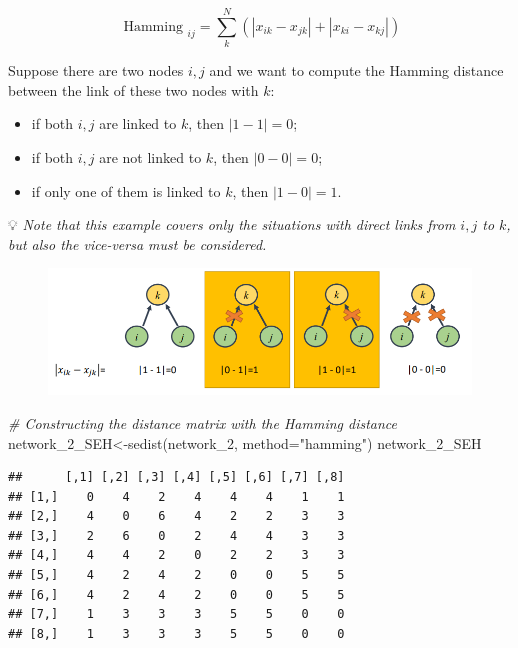 \documentclass[
  notitlepage,
  onecolumn,
  openany]{book}
\newenvironment{Shaded}{\begin{snugshade}}{\end{snugshade}}
\newcommand{\AttributeTok}[1]{\textcolor[rgb]{0.77,0.63,0.00}{#1}}
\newcommand{\CommentTok}[1]{\textcolor[rgb]{0.56,0.35,0.01}{\textit{#1}}}
\newcommand{\FunctionTok}[1]{\textcolor[rgb]{0.00,0.00,0.00}{#1}}
\newcommand{\NormalTok}[1]{#1}
\newcommand{\OtherTok}[1]{\textcolor[rgb]{0.56,0.35,0.01}{#1}}
\newcommand{\StringTok}[1]{\textcolor[rgb]{0.31,0.60,0.02}{#1}}
\providecommand{\tightlist}{%
  \setlength{\itemsep}{0pt}\setlength{\parskip}{0pt}}
\begin{document}
\[
\text { Hamming }_{i j}=\sum_{k}^{N}\left(\left|x_{i k}-x_{j k}\right|+\left|x_{k i}-x_{k j}\right|\right)
\]

Suppose there are two nodes \(i,j\) and we want to compute the Hamming distance between the link of these two nodes with \(k\):

\begin{itemize}
\tightlist
\item
  if both \(i,j\) are linked to \(k\), then \(|1-1| = 0\);
\item
  if both \(i,j\) are not linked to \(k\), then \(|0-0| = 0\);
\item
  if only one of them is linked to \(k\), then \(|1-0| = 1\).
\end{itemize}

💡 \emph{Note that this example covers only the situations with direct links from \(i,j\) to \(k\), but also the vice-versa must be considered.}

\begin{figure}[h!]

{\centering \includegraphics[width=0.5\linewidth]{images/11-Subgroups and Structural Equivalence/Untitled 6} 

}

\end{figure}

\begin{Shaded}
\begin{Highlighting}[]
\CommentTok{\# Constructing the distance matrix with the Hamming distance}
\NormalTok{network\_2\_SEH}\OtherTok{\textless{}{-}}\FunctionTok{sedist}\NormalTok{(network\_2, }\AttributeTok{method=}\StringTok{"hamming"}\NormalTok{)}
\NormalTok{network\_2\_SEH }
\end{Highlighting}
\end{Shaded}

\begin{verbatim}
##      [,1] [,2] [,3] [,4] [,5] [,6] [,7] [,8]
## [1,]    0    4    2    4    4    4    1    1
## [2,]    4    0    6    4    2    2    3    3
## [3,]    2    6    0    2    4    4    3    3
## [4,]    4    4    2    0    2    2    3    3
## [5,]    4    2    4    2    0    0    5    5
## [6,]    4    2    4    2    0    0    5    5
## [7,]    1    3    3    3    5    5    0    0
## [8,]    1    3    3    3    5    5    0    0
\end{verbatim}
\end{document}
